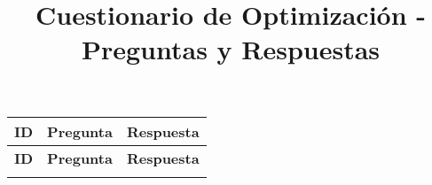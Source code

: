 \documentclass{article}
\title{Cuestionario de Optimización - Preguntas y Respuestas}
\author{}
\date{}
\begin{document}
\setlength{\LTpre}{0pt}
\setlength{\LTpost}{0pt}

\maketitle

\begin{longtable}{|>{\centering\arraybackslash}p{1.5cm}|>{\raggedright\arraybackslash}p{14cm}|>{\centering\arraybackslash}p{2cm}|}
\hline
\textbf{ID} & \textbf{Pregunta} & \textbf{Respuesta} \\
\hline
\endfirsthead

\hline
\textbf{ID} & \textbf{Pregunta} & \textbf{Respuesta} \\
\hline
\endhead

\hline
\endfoot

\hline
\endlastfoot


\end{longtable}
\end{document}
